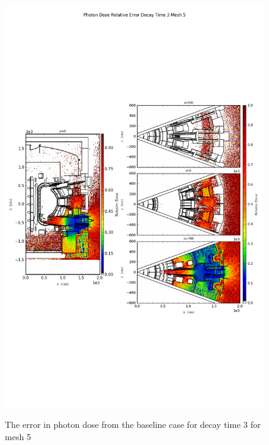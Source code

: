 \begin{figure}[ht!]
\centering
\includegraphics[trim={0cm 9cm 0cm 10cm},clip,scale=0.75]{../plots/final_model_nob4c/Photon_Dose_Relative_Error_Decay_Time_3_Mesh_5.png}
\label{fig:photons_dc3_no4bc_m5_error}
\caption{The error in photon dose from the baseline case for decay time 3 for mesh 5}
\end{figure}
